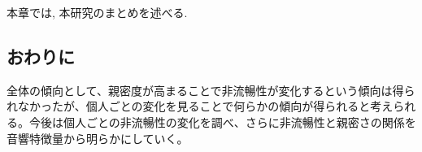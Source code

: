 本章では, 本研究のまとめを述べる.

\subsection{おわりに}
全体の傾向として、親密度が高まることで非流暢性が変化するという傾向は得られなかったが、個人ごとの変化を見ることで何らかの傾向が得られると考えられる。今後は個人ごとの非流暢性の変化を調べ、さらに非流暢性と親密さの関係を音響特徴量から明らかにしていく。


